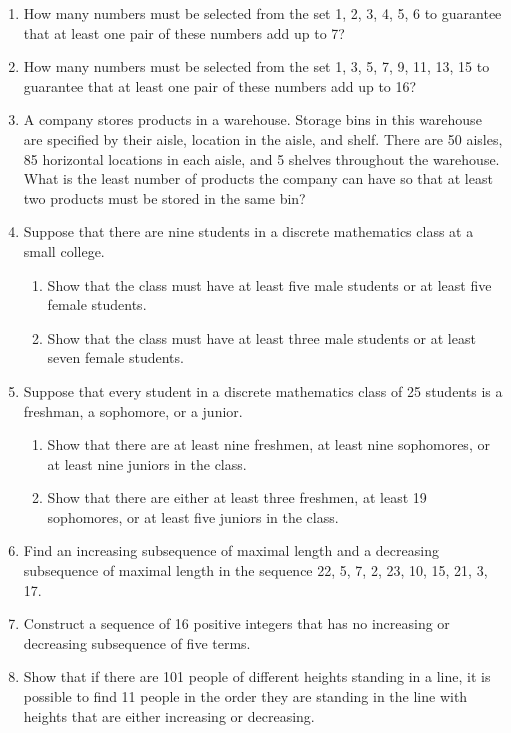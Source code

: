 \documentclass[11pt,a4paper]{book}
\begin{document}
\begin{enumerate}
\begin{enumerate}[label=(\alph*)]
\end{enumerate}
\item How many numbers must be selected from the set {1, 2, 3, 4, 5, 6} to guarantee that at least one pair of these numbers add up to 7?
\item How many numbers must be selected from the set {1, 3, 5, 7, 9, 11, 13, 15} to guarantee that at least one pair of these numbers add up to 16?
\item A company stores products in a warehouse.
Storage bins in this warehouse are specified by their aisle, location in the aisle, and shelf.
There are 50 aisles, 85 horizontal locations in each aisle, and 5 shelves throughout the warehouse.
What is the least number of products the company can have so that at least two products must be stored in the same bin?
\item Suppose that there are nine students in a discrete mathematics class at a small college.
\begin{enumerate}[label=(\alph*)]
\item Show that the class must have at least five male students or at least five female students.
\item Show that the class must have at least three male students or at least seven female students.
\end{enumerate}
\item Suppose that every student in a discrete mathematics class of 25 students is a freshman, a sophomore, or a junior.
\begin{enumerate}[label=(\alph*)]
\item Show that there are at least nine freshmen, at least nine sophomores, or at least nine juniors in the class.
\item Show that there are either at least three freshmen, at least 19 sophomores, or at least five juniors in the class.
\end{enumerate}
\item Find an increasing subsequence of maximal length and a decreasing subsequence of maximal length in the sequence 22, 5, 7, 2, 23, 10, 15, 21, 3, 17.
\item Construct a sequence of 16 positive integers that has no increasing or decreasing subsequence of five terms.
\item Show that if there are 101 people of different heights standing in a line, it is possible to find 11 people in the order they are standing in the line with heights that are either increasing or decreasing.

\end{enumerate}
\end{document}
